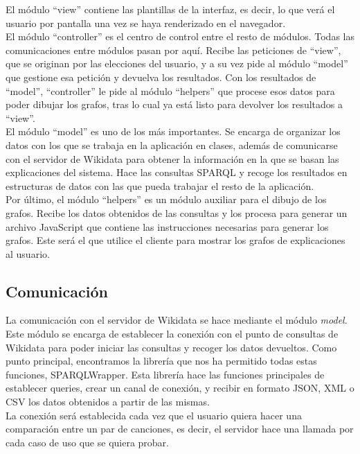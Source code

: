 El módulo ``view'' contiene las plantillas de la interfaz, es decir, lo que verá el usuario por pantalla una vez se haya renderizado en el navegador.\\

El módulo ``controller'' es el centro de control entre el resto de módulos. Todas las comunicaciones entre módulos pasan por aquí. Recibe las peticiones de ``view'', que se originan por las elecciones del usuario, y a su vez pide al módulo ``model'' que gestione esa petición y devuelva los resultados. Con los resultados de ``model'', ``controller'' le pide al módulo ``helpers'' que procese esos datos para poder dibujar los grafos, tras lo cual ya está listo para devolver los resultados a ``view''.\\

El módulo ``model'' es uno de los más importantes. Se encarga de organizar los datos con los que se trabaja en la aplicación en clases, además de comunicarse con el servidor de Wikidata para obtener la información en la que se basan las explicaciones del sistema. Hace las consultas SPARQL y recoge los resultados en estructuras de datos con las que pueda trabajar el resto de la aplicación.\\

Por último, el módulo ``helpers'' es un módulo auxiliar para el dibujo de los grafos. Recibe los datos obtenidos de las consultas y los procesa para generar un archivo JavaScript que contiene las instrucciones necesarias para generar los grafos. Este será el que utilice el cliente para mostrar los grafos de explicaciones al usuario.\\

\subsection{Comunicación}

La comunicación con el servidor de Wikidata se hace mediante el módulo \textit{model}. Este módulo se encarga de establecer la conexión con el punto de consultas de Wikidata para poder iniciar las consultas y recoger los datos devueltos. Como punto principal, encontramos la librería que nos ha permitido todas estas funciones, SPARQLWrapper. Esta librería hace las funciones principales de establecer queries, crear un canal de conexión, y recibir en formato JSON, XML o CSV los datos obtenidos a partir de las mismas.\\

La conexión será establecida cada vez que el usuario quiera hacer una comparación entre un par de canciones, es decir, el servidor hace una llamada por cada caso de uso que se quiera probar.\\

